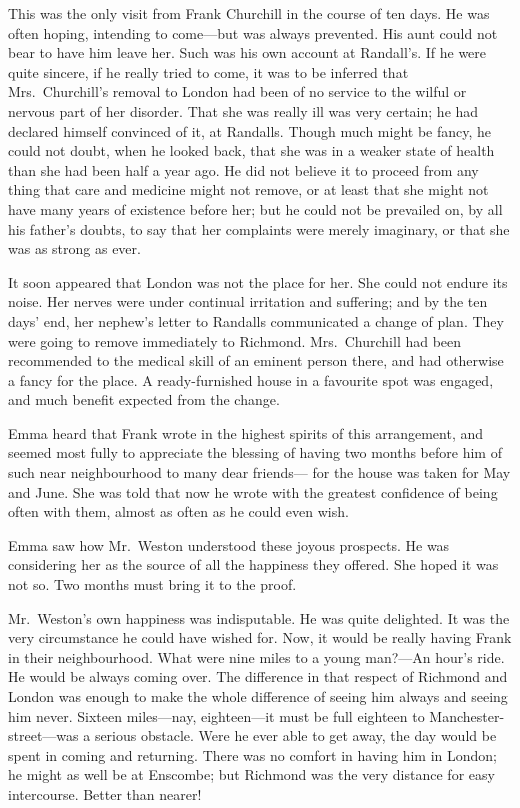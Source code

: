 This was the only visit from Frank Churchill in the course of ten days.
He was often hoping, intending to come---but was always prevented.
His aunt could not bear to have him leave her.  Such was his own account
at Randall's. If he were quite sincere, if he really tried to come,
it was to be inferred that Mrs.\ Churchill's removal to London had
been of no service to the wilful or nervous part of her disorder.
That she was really ill was very certain; he had declared himself
convinced of it, at Randalls.  Though much might be fancy, he could
not doubt, when he looked back, that she was in a weaker state
of health than she had been half a year ago.  He did not believe it
to proceed from any thing that care and medicine might not remove,
or at least that she might not have many years of existence before her;
but he could not be prevailed on, by all his father's doubts, to say
that her complaints were merely imaginary, or that she was as strong
as ever.

It soon appeared that London was not the place for her.  She could
not endure its noise.  Her nerves were under continual irritation
and suffering; and by the ten days' end, her nephew's letter to
Randalls communicated a change of plan.  They were going to remove
immediately to Richmond.  Mrs.\ Churchill had been recommended
to the medical skill of an eminent person there, and had otherwise
a fancy for the place.  A ready-furnished house in a favourite
spot was engaged, and much benefit expected from the change.

Emma heard that Frank wrote in the highest spirits of this arrangement,
and seemed most fully to appreciate the blessing of having two
months before him of such near neighbourhood to many dear friends---%
for the house was taken for May and June.  She was told that now
he wrote with the greatest confidence of being often with them,
almost as often as he could even wish.

Emma saw how Mr.\ Weston understood these joyous prospects.  He was
considering her as the source of all the happiness they offered.
She hoped it was not so.  Two months must bring it to the proof.

Mr.\ Weston's own happiness was indisputable.  He was quite delighted.
It was the very circumstance he could have wished for.  Now, it would
be really having Frank in their neighbourhood.  What were nine miles
to a young man?---An hour's ride.  He would be always coming over.
The difference in that respect of Richmond and London was enough
to make the whole difference of seeing him always and seeing
him never.  Sixteen miles---nay, eighteen---it must be full eighteen
to Manchester-street---was a serious obstacle.  Were he ever able
to get away, the day would be spent in coming and returning.
There was no comfort in having him in London; he might as well be
at Enscombe; but Richmond was the very distance for easy intercourse.
Better than nearer!

